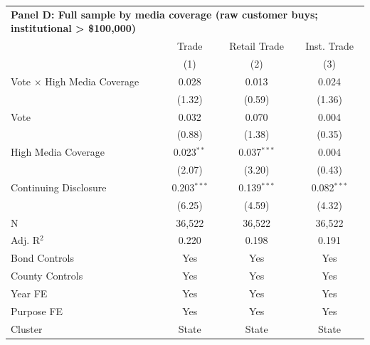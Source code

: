 \begingroup
\centering
\begin{tabular*}{\textwidth}{@{\extracolsep{\fill}}lccc}
\multicolumn{5}{l}{\textbf{Panel D: Full sample by media coverage (raw customer buys; institutional > \$100,000)}}\\

\addlinespace
   \toprule
                                      & Trade         & Retail Trade  & Inst. Trade\\  
                                      & (1)           & (2)           & (3)\\  
   \midrule 
   Vote $\times$ High Media Coverage  & 0.028         & 0.013         & 0.024\\   
                                      & (1.32)       & (0.59)       & (1.36)\\   
   Vote                               & 0.032         & 0.070         & 0.004\\   
                                      & (0.88)       & (1.38)       & (0.35)\\   
   High Media Coverage                & 0.023$^{**}$  & 0.037$^{***}$ & 0.004\\   
                                      & (2.07)       & (3.20)       & (0.43)\\   
   Continuing Disclosure              & 0.203$^{***}$ & 0.139$^{***}$ & 0.082$^{***}$\\   
                                      & (6.25)       & (4.59)       & (4.32)\\   
   \hline
   N                       & 36,522        & 36,522        & 36,522\\  
   Adj. R$^2$                     & 0.220         & 0.198         & 0.191\\  
   Bond Controls                      & Yes           & Yes           & Yes\\  
   County Controls                    & Yes           & Yes           & Yes\\  
   Year FE                            & Yes           & Yes           & Yes\\  
   Purpose FE                         & Yes           & Yes           & Yes\\  
   Cluster              & State & State & State\\  
   \bottomrule
\end{tabular*}
\par\endgroup
